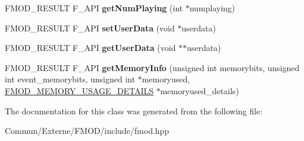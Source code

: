 \begin{DoxyCompactItemize}
\item 
F\+M\+O\+D\+\_\+\+R\+E\+S\+U\+LT F\+\_\+\+A\+PI {\bfseries get\+Num\+Playing} (int $\ast$numplaying)\hypertarget{class_f_m_o_d_1_1_sound_group_af88057e101e4dd2268d1a6f6656db75b}{}\label{class_f_m_o_d_1_1_sound_group_af88057e101e4dd2268d1a6f6656db75b}

\item 
F\+M\+O\+D\+\_\+\+R\+E\+S\+U\+LT F\+\_\+\+A\+PI {\bfseries set\+User\+Data} (void $\ast$userdata)\hypertarget{class_f_m_o_d_1_1_sound_group_a3315678b522baf2d74f732ab671f48c7}{}\label{class_f_m_o_d_1_1_sound_group_a3315678b522baf2d74f732ab671f48c7}

\item 
F\+M\+O\+D\+\_\+\+R\+E\+S\+U\+LT F\+\_\+\+A\+PI {\bfseries get\+User\+Data} (void $\ast$$\ast$userdata)\hypertarget{class_f_m_o_d_1_1_sound_group_ac428e826a819030cbab7ffa666d7d9cd}{}\label{class_f_m_o_d_1_1_sound_group_ac428e826a819030cbab7ffa666d7d9cd}

\item 
F\+M\+O\+D\+\_\+\+R\+E\+S\+U\+LT F\+\_\+\+A\+PI {\bfseries get\+Memory\+Info} (unsigned int memorybits, unsigned int event\+\_\+memorybits, unsigned int $\ast$memoryused, \hyperlink{struct_f_m_o_d___m_e_m_o_r_y___u_s_a_g_e___d_e_t_a_i_l_s}{F\+M\+O\+D\+\_\+\+M\+E\+M\+O\+R\+Y\+\_\+\+U\+S\+A\+G\+E\+\_\+\+D\+E\+T\+A\+I\+LS} $\ast$memoryused\+\_\+details)\hypertarget{class_f_m_o_d_1_1_sound_group_aab478a5f6edb8ef0eaf8d8fc70d1a448}{}\label{class_f_m_o_d_1_1_sound_group_aab478a5f6edb8ef0eaf8d8fc70d1a448}

\end{DoxyCompactItemize}


The documentation for this class was generated from the following file\+:\begin{DoxyCompactItemize}
\item 
Commun/\+Externe/\+F\+M\+O\+D/include/fmod.\+hpp\end{DoxyCompactItemize}
